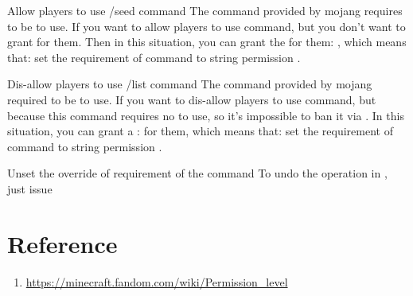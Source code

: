 \begin{example}{Allow players to use /seed command}
    The command  provided by mojang requires  to be  to use.
    If you want to allow players to use  command, but you don't want to grant  for them.
    Then in this situation, you can grant the  for them: , which means that: set the requirement of command  to string permission .
\end{example}

\begin{example}{Dis-allow players to use /list command}
    The command  provided by mojang required  to be  to use.
    If you want to dis-allow players to use  command, but because this command requires no  to use, so it's impossible to ban it via .
    In this situation, you can grant a :  for them, which means that: set the requirement of command  to string permission .
\end{example}

\begin {example}{Unset the override of requirement of the command}
    To undo the operation in , just issue 
\end{example}


\section{Reference}
\begin{enumerate}
    \item \url{https://minecraft.fandom.com/wiki/Permission\_level}
\end{enumerate}
